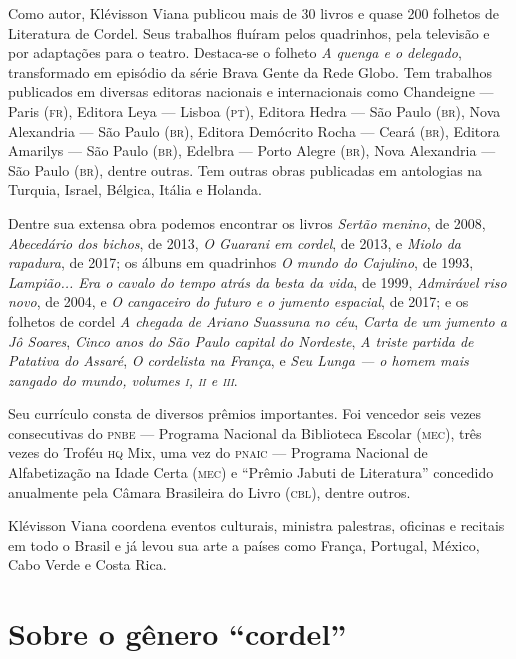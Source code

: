 \documentclass[11pt]{extarticle}
\begin{document}
Como autor, Klévisson Viana publicou mais de 30 livros e quase 200 folhetos de Literatura de Cordel. Seus trabalhos fluíram pelos quadrinhos, pela televisão e por adaptações para o teatro. Destaca-se o folheto \textit{A quenga e o delegado}, transformado em episódio da série Brava Gente da Rede Globo. Tem trabalhos publicados em diversas editoras nacionais e internacionais como Chandeigne --- Paris (\textsc{fr}), Editora Leya --- Lisboa (\textsc{pt}), Editora Hedra --- São Paulo (\textsc{br}), Nova Alexandria --- São Paulo (\textsc{br}), Editora Demócrito Rocha --- Ceará (\textsc{br}), Editora Amarilys --- São Paulo (\textsc{br}), Edelbra --- Porto Alegre (\textsc{br}), Nova Alexandria --- São Paulo (\textsc{br}), dentre outras. Tem outras obras publicadas em antologias na Turquia, Israel, Bélgica, Itália e Holanda. 

Dentre sua extensa obra podemos encontrar os livros \textit{Sertão menino}, de 2008, \textit{Abecedário dos bichos}, de 2013, \textit{O Guarani em cordel}, de 2013, e \textit{Miolo da rapadura}, de 2017; os álbuns em quadrinhos \textit{O mundo do Cajulino}, de 1993, \textit{Lampião... Era o cavalo do tempo atrás da besta da vida}, de 1999, \textit{Admirável riso novo}, de 2004, e \textit{O cangaceiro do futuro e o jumento espacial}, de 2017; e os folhetos de cordel \textit{A chegada de Ariano Suassuna no céu}, \textit{Carta de um jumento a Jô Soares}, \textit{Cinco anos do São Paulo capital do Nordeste}, \textit{A triste partida de Patativa do Assaré}, \textit{O cordelista na França}, e \textit{Seu Lunga --- o homem mais zangado do mundo, volumes \textsc{i}, \textsc{ii} e \textsc{iii}}.

Seu currículo consta de diversos prêmios importantes. Foi vencedor seis vezes consecutivas do \textsc{pnbe} --- Programa Nacional da Biblioteca Escolar (\textsc{mec}), três vezes do Troféu \textsc{hq} Mix, uma vez do \textsc{pnaic} --- Programa Nacional de Alfabetização na Idade Certa (\textsc{mec}) e ``Prêmio Jabuti de Literatura'' concedido anualmente pela Câmara Brasileira do Livro (\textsc{cbl}), dentre outros. 

Klévisson Viana coordena eventos culturais, ministra palestras, oficinas e recitais em todo o Brasil e já levou sua arte a países como França, Portugal, México, Cabo Verde e Costa Rica. 


\section{Sobre o gênero ``cordel''}
\end{document}
